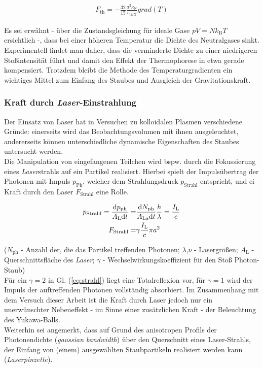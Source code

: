 \documentclass[numbers=noenddot,a4paper]{scrartcl}
\newcommand{\diff}{\textnormal{d}}
\newcommand{\ix}[1]{_\text{#1}}
\newcommand{\tilt}[1]{\textit{#1}}
\newcommand{\grad}[1]{\textit{grad}\left(#1\right)}
\begin{document}
				\begin{align}
					F\ix{th}=-\frac{32}{15}\frac{a^2 \kappa\ix{N}}{v\ix{th,N}}\grad{T} \label{eq:therm}
				\end{align}

			Es sei erwähnt -  über die Zustandsgleichung für ideale Gase $pV=Nk\ix{B}T$ ersichtlich -, dass bei einer höheren Temperatur die Dichte des Neutralgases sinkt. Experimentell findet man daher, dass die verminderte Dichte zu einer niedrigeren Stoßintensität führt und damit den Effekt der Thermophorese in etwa gerade kompensiert. Trotzdem bleibt die Methode des Temperaturgradienten ein wichtiges Mittel zum Einfang des Staubes und Ausgleich der Gravitationskraft.

		\subsubsection{Kraft durch \tilt{Laser}-Einstrahlung}\label{subsub:laser}

			Der Einsatz von Laser hat in Versuchen zu kolloidalen Plasmen verschiedene Gründe: einerseits wird das Beobachtungsvolumen mit ihnen ausgeleuchtet, andererseits können unterschiedliche dynamische Eigenschaften des Staubes untersucht werden.\\
			Die Manipulation von eingefangenen Teilchen wird bspw. durch die Fokussierung eines \tilt{Laser}strahls auf ein Partikel realisiert. Hierbei spielt der Impulsübertrag der Photonen mit Impuls $p\ix{Ph}$, welcher dem Strahlungsdruck $p\ix{Strahl}$ entspricht, und ei Kraft durch den Laser $F\ix{Strahl}$ eine Rolle.

				\begin{align}
					p\ix{Strahl}=\frac{\diff p\ix{ph}}{A\ix{L}\diff t}=&\frac{\diff N\ix{ph}}{A\ix{La}\diff t}\frac{h}{\lambda}=\frac{I\ix{L}}{c} \nonumber \\
					F\ix{Strahl}=&\gamma\frac{I\ix{L}}{c}\pi a^2 \label{eq:strahl}
				\end{align}

			($N\ix{ph}$ - Anzahl der, die das Partikel treffenden Photonen; $\lambda$,$\nu$ - Lasergrößen; $A\ix{L}$ - Querschnittsfläche des \tilt{Laser}; $\gamma$ - Wechselwirkungskoeffizient für den Stoß Photon-Staub)\\
			Für ein $\gamma=2$ in Gl. (\ref{eq:strahl}) liegt eine Totalreflexion vor, für $\gamma=1$ wird der Impuls der auftreffenden Photonen vollständig absorbiert. Im Zusammenhang mit dem Versuch dieser Arbeit ist die Kraft durch Laser jedoch nur ein unerwünschter Nebeneffekt - im Sinne einer zusätzlichen Kraft - der Beleuchtung des Yukawa-Balls.\\
			Weiterhin sei angemerkt, dass auf Grund des anisotropen Profils der Photonendichte (\tilt{gaussian bandwidth}) über den Querschnitt eines Laser-Strahls, der Einfang von (einem) ausgewählten Staubpartikeln realisiert werden kann (\tilt{Laserpinzette}).
\end{document}
